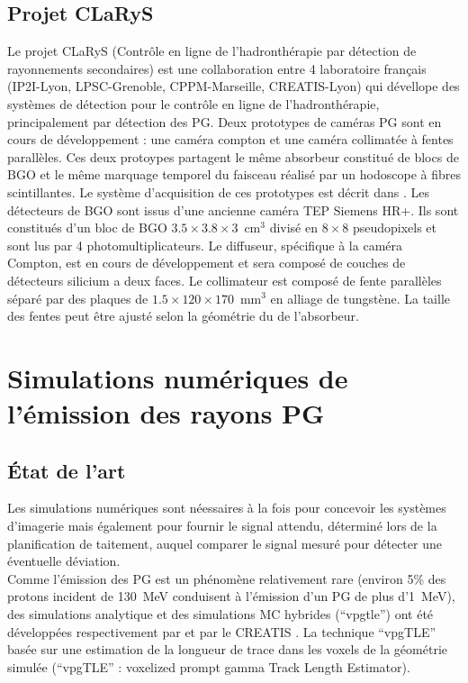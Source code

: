 \documentclass[11pt,a4paper,oldfontcommands]{memoir}
\begin{document}
\subsection{Projet CLaRyS}

Le projet CLaRyS (Contrôle en ligne de l’hadronthérapie par détection de rayonnements secondaires) est une collaboration entre 4 laboratoire français (IP2I-Lyon, LPSC-Grenoble, CPPM-Marseille, CREATIS-Lyon) qui dévellope des systèmes de détection pour le contrôle en ligne de l'hadronthérapie, principalement par détection des PG. Deux prototypes de caméras PG sont en cours de développement : une caméra compton et une caméra collimatée à fentes parallèles. Ces deux protoypes partagent le même absorbeur constitué de blocs de BGO et le même marquage temporel du faisceau réalisé par un hodoscope à fibres scintillantes. Le système d'acquisition de ces prototypes est décrit dans \cite{Caplan_2019}. Les détecteurs de BGO sont issus d'une ancienne caméra TEP Siemens HR+. Ils sont constitués d'un bloc de BGO $3.5 \times 3.8 \times 3$~cm$^3$ divisé en $8 \times 8$ pseudopixels et sont lus par 4 photomultiplicateurs. Le diffuseur, spécifique à la caméra Compton, est en cours de développement et sera composé de couches de détecteurs silicium a deux faces. Le collimateur est composé de fente parallèles séparé par des plaques de $1.5 \times 120 \times 170$~mm$^3$ en alliage de tungstène. La taille des fentes peut être ajusté selon la géométrie du de l'absorbeur. 

\section{Simulations numériques de l'émission des rayons PG}

\subsection{\'Etat de l'art}

Les simulations numériques sont néessaires à la fois pour concevoir les systèmes d'imagerie mais également pour fournir le signal attendu, déterminé lors de la planification de taitement, auquel comparer le signal mesuré pour détecter une éventuelle déviation. \\
Comme l'émission des PG est un phénomène relativement rare (environ 5\% des protons incident de 130~MeV conduisent à l'émission d'un PG de plus d'1~MeV), des simulations analytique et des simulations MC hybrides (\enquote{vpgtle}) ont été développées respectivement par \cite{Sterpin_2015} et par le CREATIS \cite{Huisman_2016}. La technique \enquote{vpgTLE} basée sur une estimation de la longueur de trace dans les voxels de la géométrie simulée (\enquote{vpgTLE} : voxelized prompt gamma Track Length Estimator).
\end{document}
